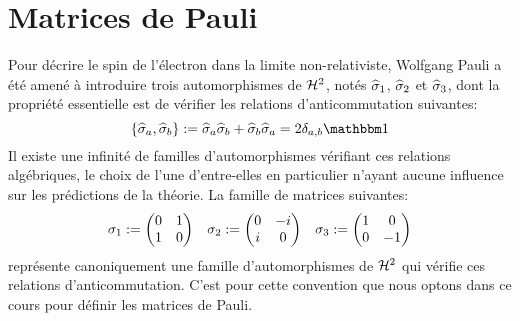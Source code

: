 \section{Matrices de Pauli}

Pour décrire le spin de l'électron dans la limite non-relativiste,
Wolfgang Pauli a été amené à introduire trois automorphismes de $\mathcal H^2$,
notés $\widehat{\sigma}_{1}$, $\widehat{\sigma}_{2}$ et $\widehat{\sigma}_{3}$,
dont la propriété essentielle est de vérifier les relations d'anticommutation suivantes:
\begin{equation*}
\left\{ \sigop a, \sigop b \right\} \eqdef \sigop a \sigop b + \sigop b \sigop a = 2 \delta_{a,b} \Id
\end{equation*}
Il existe une infinité de familles d'automorphismes vérifiant ces relations algébriques,
le choix de l'une d'entre-elles en particulier n'ayant aucune influence sur les prédictions de la théorie.
La famille de matrices suivantes:
$$
\begin{array}{ccc}
\sigma_{1} := \left(\begin{matrix} 0 & 1 \\ 1 & 0 \end{matrix}\right) &
\sigma_{2} := \left(\begin{matrix} 0 & -i \\ i & 0\end{matrix}\right) &
\sigma_{3} := \left(\begin{matrix} 1 & 0 \\ 0 & -1\end{matrix}\right)
\end{array}
$$
représente canoniquement une famille d'automorphismes de $\mathcal H^2$ qui vérifie ces relations d'anticommutation.
C'est pour cette convention que nous optons dans ce cours pour définir les matrices de Pauli.
